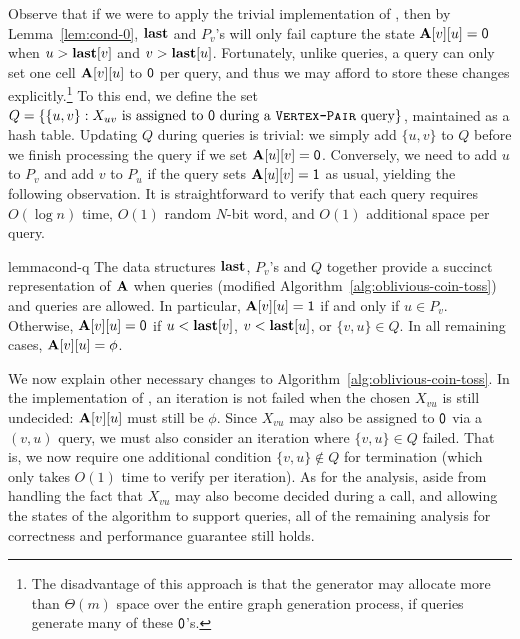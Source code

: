 Observe that if we were to apply the trivial implementation of , then by Lemma~\ref{lem:cond-0}, $\mathbf{last}$ and $P_v$'s will only fail capture the state $\mathbf{A}[v][u] = \mathsf{0}$ when $u > \mathbf{last}[v]$ and $v > \mathbf{last}[u]$. Fortunately, unlike  queries, a  query can only set one cell $\mathbf{A}[v][u]$ to $\mathsf{0}$ per query, and thus we may afford to store these changes explicitly.\footnote{The disadvantage of this approach is that the generator may allocate more than $\Theta(m)$ space over the entire graph generation process, if  queries generate many of these $\mathsf{0}$'s.} To this end, we define the set $Q = \{\{u,v\}: X_{uv}\textrm{ is assigned to }\mathsf{0} \textrm{ during a \texttt{\textsc{Vertex-Pair}} query}\}$, maintained as a hash table. Updating $Q$ during  queries is trivial: we simply add $\{u,v\}$ to $Q$ before we finish processing the query if we set $\mathbf{A}[u][v]=\mathsf{0}$. Conversely, we need to add $u$ to $P_v$ and add $v$ to $P_u$ if the  query sets $\mathbf{A}[u][v]=\mathsf{1}$ as usual, yielding the following observation. It is straightforward to verify that each  query requires $O(\log n)$ time, $O(1)$ random $N$-bit word, and $O(1)$ additional space per query.

\begin{restatable}{lemma}{cond-q}\label{lem:cond-0-q}
The data structures $\mathbf{last}$, $P_v$'s and $Q$ together provide a succinct representation of $\mathbf{A}$ when  queries (modified Algorithm~\ref{alg:oblivious-coin-toss}) and  queries are allowed. In particular, $\mathbf{A}[v][u]=\mathsf{1}$ if and only if $u \in P_v$. Otherwise, $\mathbf{A}[v][u]=\mathsf{0}$ if $u <\mathbf{last}[v]$, $v < \mathbf{last}[u]$, or $\{v,u\} \in Q$. In all remaining cases, $\mathbf{A}[v][u]=\phi$.
\end{restatable}

We now explain other necessary changes to Algorithm~\ref{alg:oblivious-coin-toss}. In the implementation of , an iteration is not failed when the chosen $X_{vu}$ is still undecided: $\mathbf{A}[v][u]$ must still be $\phi$. Since $X_{vu}$ may also be assigned to $\mathsf{0}$ via a $(v,u)$ query, we must also consider an iteration where $\{v,u\} \in Q$ failed. That is, we now require one additional condition $\{v,u\} \notin Q$ for termination (which only takes $O(1)$ time to verify per iteration). As for the analysis, aside from handling the fact that $X_{vu}$ may also become decided during a  call, and allowing the states of the algorithm to support  queries, all of the remaining analysis for correctness and performance guarantee still holds. 


